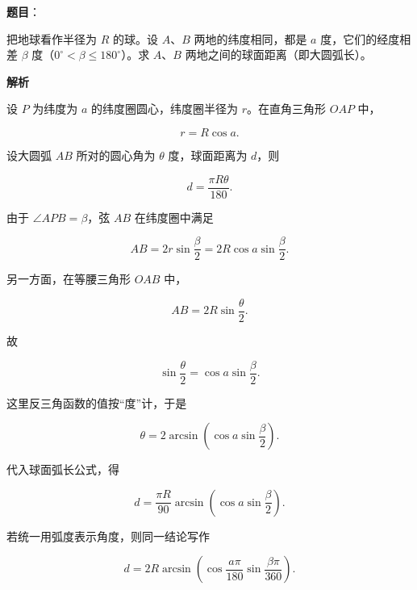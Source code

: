 \begin{answer}

\textbf{题目}：

把地球看作半径为 $R$ 的球。设 $A$、$B$ 两地的纬度相同，都是 $a$ 度，它们的经度相差 $\beta$ 度（$0^\circ<\beta\leqslant180^\circ$）。求 $A$、$B$ 两地之间的球面距离（即大圆弧长）。
\nopagebreak[4]
\begin{center}\end{center}
\nopagebreak[4]
\textbf{解析}

设 $P$ 为纬度为 $a$ 的纬度圈圆心，纬度圈半径为 $r$。在直角三角形 $OAP$ 中，

\nopagebreak[4]
\[r=R\cos a.\]

设大圆弧 $AB$ 所对的圆心角为 $\theta$ 度，球面距离为 $d$，则

\nopagebreak[4]
\[d=\frac{\pi R\theta}{180}.\]

由于 $\angle APB=\beta$，弦 $AB$ 在纬度圈中满足

\nopagebreak[4]
\[AB=2r\sin\frac\beta2=2R\cos a\sin\frac\beta2.\]

另一方面，在等腰三角形 $OAB$ 中，

\nopagebreak[4]
\[AB=2R\sin\frac\theta2.\]

故

\nopagebreak[4]
\[\sin\frac\theta2=\cos a\sin\frac\beta2.\]

这里反三角函数的值按“度”计，于是

\nopagebreak[4]
\[\theta=2\arcsin\left(\cos a\sin\frac\beta2\right).\]

代入球面弧长公式，得

\nopagebreak[4]
\[d=\frac{\pi R}{90}\arcsin\left(\cos a\sin\frac\beta2\right).\]

若统一用弧度表示角度，则同一结论写作

\nopagebreak[4]
\[d=2R\arcsin\left(\cos\frac{a\pi}{180}\sin\frac{\beta\pi}{360}\right).\]


\end{answer}

